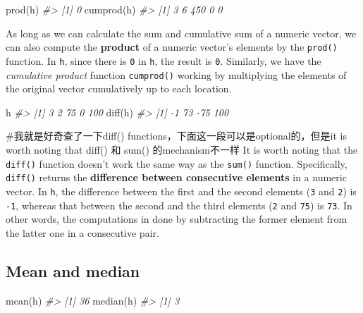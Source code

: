 \documentclass[
]{book}
\newenvironment{Shaded}{\begin{snugshade}}{\end{snugshade}}
\newcommand{\CommentTok}[1]{\textcolor[rgb]{0.56,0.35,0.01}{\textit{#1}}}
\newcommand{\FunctionTok}[1]{\textcolor[rgb]{0.00,0.00,0.00}{#1}}
\newcommand{\NormalTok}[1]{#1}
\begin{document}
\begin{Shaded}
\begin{Highlighting}[]
\FunctionTok{prod}\NormalTok{(h)}
\CommentTok{\#\textgreater{} [1] 0}
\FunctionTok{cumprod}\NormalTok{(h)}
\CommentTok{\#\textgreater{} [1]   3   6 450   0   0}
\end{Highlighting}
\end{Shaded}

As long as we can calculate the sum and cumulative sum of a numeric vector, we can also compute the \textbf{product} of a numeric vector's elements by the \texttt{prod()} function. In \texttt{h}, since there is \texttt{0} in \texttt{h}, the result is \texttt{0}. Similarly, we have the \emph{cumulative product} function \texttt{cumprod()} working by multiplying the elements of the original vector cumulatively up to each location.

\begin{Shaded}
\begin{Highlighting}[]
\NormalTok{h}
\CommentTok{\#\textgreater{} [1]   3   2  75   0 100}
\FunctionTok{diff}\NormalTok{(h)}
\CommentTok{\#\textgreater{} [1]  {-}1  73 {-}75 100}
\end{Highlighting}
\end{Shaded}

\#我就是好奇查了一下diff() functions，下面这一段可以是optional的，但是it is worth noting that diff() 和 sum() 的mechanism不一样
It is worth noting that the \texttt{diff()} function doesn't work the same way as the \texttt{sum()} function. Specifically, \texttt{diff()} returns the \textbf{difference between consecutive elements} in a numeric vector. In \texttt{h}, the difference between the first and the second elements (\texttt{3} and \texttt{2}) is \texttt{-1}, whereas that between the second and the third elements (\texttt{2} and \texttt{75}) is \texttt{73}. In other words, the computations in done by subtracting the former element from the latter one in a consecutive pair.

\hypertarget{mean-and-median}{%
\subsection{Mean and median}\label{mean-and-median}}

\begin{Shaded}
\begin{Highlighting}[]
\FunctionTok{mean}\NormalTok{(h)}
\CommentTok{\#\textgreater{} [1] 36}
\FunctionTok{median}\NormalTok{(h)}
\CommentTok{\#\textgreater{} [1] 3}
\end{Highlighting}
\end{Shaded}
\end{document}
